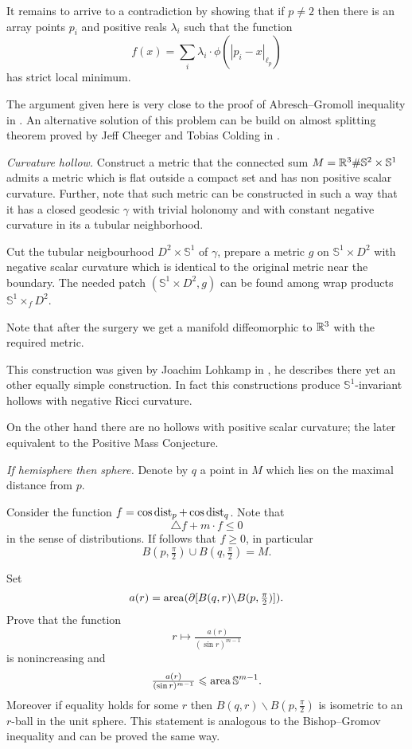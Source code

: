 It remains to arrive to a contradiction
by showing that if $p\ne 2$ then there is an array
points $p_i$ and positive reals $\lambda_i$
such that the function 
$$f(x)=\sum_i\lambda_i\cdot\phi(|p_i-x|_{\ell_p})$$
has strict local minimum.

 The argument given here is very close to the proof of Abresch--Gromoll inequality in \cite{abresch-gromoll}.
An alternative solution of this problem can be build on almost splitting theorem proved by  Jeff Cheeger and Tobias Colding in \cite{cheeger-colding}.


\textit{Curvature hollow.}
Construct a metric that the connected sum
$M=\mathbb{R}^3\#\mathbb{S}^2\times\mathbb{S}^1$ admits a metric which is flat outside a compact set and has non positive scalar curvature.
Further, note that such metric can be constructed in such a way that it has a closed geodesic $\gamma$ with trivial holonomy and with constant negative curvature in its a tubular neighborhood.

Cut the tubular neigbourhood $D^2\times \mathbb{S}^1$ of $\gamma$, 
prepare a metric $g$ on $\mathbb{S}^1\times D^2$ with negative scalar curvature which 
is identical to the original metric near the boundary.
The needed patch $(\mathbb{S}^1\times D^2,g)$ can be found among wrap products $\mathbb{S}^1\times_f D^2$.

Note that after the surgery we get a manifold diffeomorphic to $\mathbb{R}^3$ with the required metric.

This construction was given by Joachim Lohkamp in \cite{lohkamp},
he describes there yet an other equally simple construction.
In fact this  constructions produce 
$\mathbb{S}^1$-invariant hollows 
with negative Ricci curvature.

On the other hand there are no hollows with positive scalar curvature;
the later equivalent to the Positive Mass Conjecture.

\textit{If hemisphere then sphere.}
Denote by $q$ a point in $M$ which lies on the maximal distance from $p$.

Consider the function $f=\cos \operatorname{\rm dist}_p+\cos\operatorname{\rm dist}_q$.
Note that 
\[\triangle f+m\cdot f\le 0\] 
in the sense of distributions.
If follows that $f\ge 0$, in particular 
\[B(p,\tfrac\pi2)\cup B(q,\tfrac\pi2)=M.\]

Set \[a(r)=\operatorname{\rm area}(\partial [B(q,r)\backslash B(p,\tfrac\pi2)]).\]
Prove that the function
\[r \mapsto \tfrac{a(r)}{(\sin r)^{m-1}}\]
is nonincreasing 
and 
\[\tfrac{a(r)}{(\sin r)^{m-1}}\leqslant\operatorname{\rm area}\mathbb{S}^{m-1}.\]
Moreover if equality holds for some $r$ then $B(q,r)\backslash B(p,\tfrac\pi2)$ is isometric to an $r$-ball in the unit sphere.
This statement is analogous to the Bishop--Gromov inequality and can be proved the same way.

